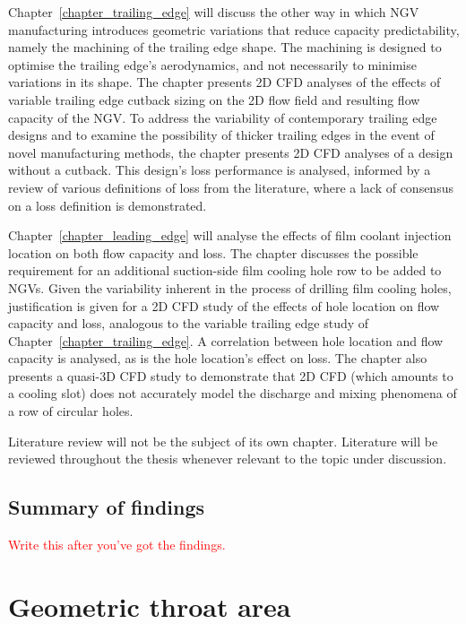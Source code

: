 \documentclass[a4paper, 11pt, oneside]{report}
\begin{document}
Chapter~\ref{chapter_trailing_edge} will discuss the other way in which NGV manufacturing introduces geometric variations that reduce capacity predictability, namely the machining of the trailing edge shape. The machining is designed to optimise the trailing edge's aerodynamics, and not necessarily to minimise variations in its shape. The chapter presents 2D CFD analyses of the effects of variable trailing edge cutback sizing on the 2D flow field and resulting flow capacity of the NGV. To address the variability of contemporary trailing edge designs and to examine the possibility of thicker trailing edges in the event of novel manufacturing methods, the chapter presents 2D CFD analyses of a design without a cutback. This design's loss performance is analysed, informed by a review of various definitions of loss from the literature, where a lack of consensus on a loss definition is demonstrated.

Chapter~\ref{chapter_leading_edge} will analyse the effects of film coolant injection location on both flow capacity and loss. The chapter discusses the possible requirement for an additional suction-side film cooling hole row to be added to NGVs. Given the variability inherent in the process of drilling film cooling holes, justification is given for a 2D CFD study of the effects of hole location on flow capacity and loss, analogous to the variable trailing edge study of Chapter~\ref{chapter_trailing_edge}. A correlation between hole location and flow capacity is analysed, as is the hole location's effect on loss. The chapter also presents a quasi-3D CFD study to demonstrate that 2D CFD (which amounts to a cooling slot) does not accurately model the discharge and mixing phenomena of a row of circular holes.

Literature review will not be the subject of its own chapter. Literature will be reviewed throughout the thesis whenever relevant to the topic under discussion.

\section{Summary of findings}

\textcolor{red}{Write this after you've got the findings.}

\chapter{Geometric throat area}
\label{chapter_geometric_throat_area}
\end{document}
